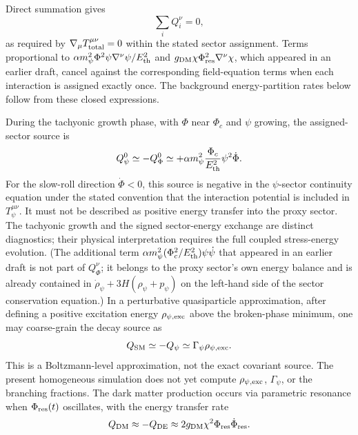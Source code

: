 \documentclass[epj]{svjour}
\begin{document}
Direct summation gives
\begin{equation}
\sum_i Q_i^\nu=0,
\end{equation}
as required by
\(\nabla_\mu T^{\mu\nu}_{\rm total}=0\) within the stated sector
assignment. Terms proportional to
\(\alpha m_\psi^2\Phi^2\psi\nabla^\nu\psi/E_{\rm th}^2\) and
\(g_{\rm DM}\chi\Phi_{\rm res}^2\nabla^\nu\chi\), which appeared in
an earlier draft, cancel against the corresponding field-equation
terms when each interaction is assigned exactly once. The background
energy-partition rates below follow from these closed expressions.

During the tachyonic growth phase, with \(\Phi\) near \(\Phi_c\) and
\(\psi\) growing, the assigned-sector source is
\begin{equation}
Q_\psi^0 \simeq -Q_\Phi^0
\simeq +\alpha m_\psi^2\frac{\Phi_c}{E_{\rm th}^2}
\psi^2\dot\Phi.
\end{equation}
For the slow-roll direction \(\dot\Phi<0\), this source is negative
in the \(\psi\)-sector continuity equation under the stated convention
that the interaction potential is included in \(T_\psi^{\mu\nu}\).
It must not be described as positive energy transfer into the proxy
sector. The tachyonic growth and the signed sector-energy exchange
are distinct diagnostics; their physical interpretation requires
the full coupled stress-energy evolution.
(The additional term \(\alpha m_\psi^2(\Phi_c^2/E_{\rm th}^2)\psi\dot\psi\)
that appeared in an earlier draft is not part of \(Q_\Phi^\nu\); it
belongs to the proxy sector's own energy balance and is already
contained in \(\dot\rho_\psi+3H(\rho_\psi+p_\psi)\) on the left-hand
side of the sector conservation equation.)
In a perturbative quasiparticle approximation, after defining a
positive excitation energy $\rho_{\psi,\rm exc}$ above the
broken-phase minimum, one may coarse-grain the decay source as
\begin{equation}
Q_{\rm SM}\simeq -Q_\psi\simeq\Gamma_\psi\rho_{\psi,\rm exc}.
\end{equation}
This is a Boltzmann-level approximation, not the exact covariant
source. The present homogeneous simulation does not yet compute
$\rho_{\psi,\rm exc}$, $\Gamma_\psi$, or the branching fractions.
The dark matter production occurs via parametric resonance when $\Phi_{\rm res}(t)$ oscillates, with the energy transfer rate
\begin{equation}
Q_{\rm DM} \approx -Q_{\rm DE} \approx 2g_{\rm DM}\chi^2\Phi_{\rm res}\dot\Phi_{\rm res}.
\end{equation}
\end{document}
